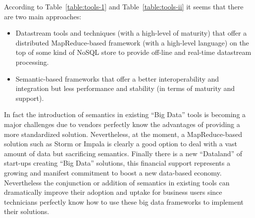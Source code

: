 According to Table~\ref{table:tools-1} and Table~\ref{table:tools-ii} it seems that there are two main approaches:
\begin{itemize}
 \item Datastream tools and techniques (with a high-level of maturity) that offer a distributed MapReduce-based 
 framework (with a high-level language) on the top of some kind of NoSQL store to provide off-line and real-time datastream processing.
 \item Semantic-based frameworks that offer a better interoperability and integration but less performance and stability (in terms of maturity and support).
\end{itemize}
In fact the introduction of semantics in existing ``Big Data'' tools is becoming a major challenges due to vendors perfectly know the advantages 
of providing a more standardized solution. Nevertheless, at the moment, a MapReduce-based solution such as Storm or Impala is clearly a good 
option to deal with a vast amount of data but sacrificing semantics. Finally there is a new ``Dataland'' of start-ups creating ``Big Data'' solutions, 
this financial support represents a growing and manifest commitment to boost a new data-based economy. Nevertheless the conjunction or addition of semantics in 
existing tools can dramatically improve their adoption and uptake for business users since technicians perfectly know how to use these big data frameworks 
to implement their solutions.

